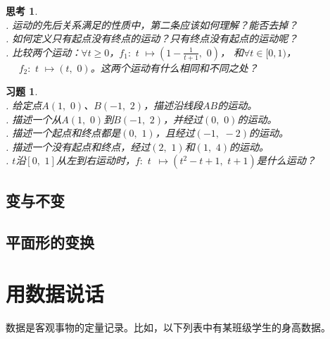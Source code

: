\documentclass[12pt,UTF8]{ctexbook}
\newtheorem{sk}{思考}[section]
\newtheorem{xt}{习题}[section]
\begin{document}
\begin{sk}
    \mbox{} \\
    . 运动的先后关系满足的性质中，第二条应该如何理解？能否去掉？\\
    . 如何定义只有起点没有终点的运动？只有终点没有起点的运动呢？\\
    . 比较两个运动：$\forall t \geqslant 0$，$f_1:\,\, t \,\, \mapsto (1 - \frac{1}{t+1}, \,\, 0)$，
    和$\forall t \in [0, 1)$，\\
    \indent $\quad \,\, f_2:\,\, t \,\, \mapsto (t, \,\,0)$。这两个运动有什么相同和不同之处？
\end{sk}

\begin{xt}
    \mbox{} \\
    . 给定点$A(1,\,\,0)$、$B(-1,\,\,2)$，描述沿线段$AB$的运动。\\
    . 描述一个从$A(1,\,\,0)$到$B(-1,\,\,2)$，并经过$(0,\,\,0)$的运动。\\
    . 描述一个起点和终点都是$(0, \,\, 1)$，且经过$(-1,\,\, -2)$的运动。\\
    . 描述一个没有起点和终点，经过$(2,\,\, 1)$和$(1,\,\, 4)$的运动。\\
    . $t$沿$[0,\,\,1]$从左到右运动时，$f: \,\, t \,\,\, \mapsto (t^2 - t + 1, \,\, t + 1)$是什么运动？
\end{xt}

\section{变与不变}

\section{平面形的变换}

\chapter{用数据说话}
数据是客观事物的定量记录。比如，以下列表中有某班级学生的身高数据。
\end{document}

